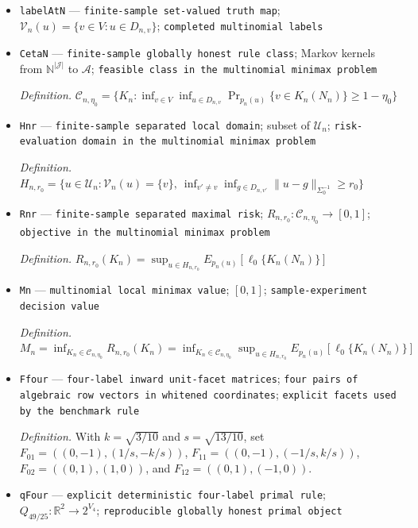 \documentclass{article}
\begin{document}
\begin{itemize}
  \item \texttt{labelAtN} --- \texttt{finite-\allowbreak{}sample set-\allowbreak{}valued truth map}; \(\mathcal V_n(u)=\{v\in V:u\in D_{n,v}\}\); \texttt{completed multinomial labels}
  \item \texttt{CetaN} --- \texttt{finite-\allowbreak{}sample globally honest rule class}; Markov kernels from \(\mathbb N^{|\mathcal J|}\) to \(\mathcal A\); \texttt{feasible class in the multinomial minimax problem}
  \par\smallskip\noindent\emph{Definition.} \(\mathcal C_{n,\eta_0}=\{K_n:\inf_{v\in V}\inf_{u\in D_{n,v}}\Pr_{p_n(u)}\{v\in K_n(N_n)\}\ge1-\eta_0\}\)
  \item \texttt{Hnr} --- \texttt{finite-\allowbreak{}sample separated local domain}; subset of \(\mathcal U_n\); \texttt{risk-\allowbreak{}evaluation domain in the multinomial minimax problem}
  \par\smallskip\noindent\emph{Definition.} \(H_{n,r_0}=\{u\in\mathcal U_n:\mathcal V_n(u)=\{v\},\ \inf_{v'\ne v}\inf_{g\in D_{n,v'}}\|u-g\|_{\Sigma_0^{-1}}\ge r_0\}\)
  \item \texttt{Rnr} --- \texttt{finite-\allowbreak{}sample separated maximal risk}; \(R_{n,r_0}:\mathcal C_{n,\eta_0}\to[0,1]\); \texttt{objective in the multinomial minimax problem}
  \par\smallskip\noindent\emph{Definition.} \(R_{n,r_0}(K_n)=\sup_{u\in H_{n,r_0}}E_{p_n(u)}[\ell_0\{K_n(N_n)\}]\)
  \item \texttt{Mn} --- \texttt{multinomial local minimax value}; \([0,1]\); \texttt{sample-\allowbreak{}experiment decision value}
  \par\smallskip\noindent\emph{Definition.} \(M_n=\inf_{K_n\in\mathcal C_{n,\eta_0}}R_{n,r_0}(K_n)=\inf_{K_n\in\mathcal C_{n,\eta_0}}\sup_{u\in H_{n,r_0}}E_{p_n(u)}[\ell_0\{K_n(N_n)\}]\)
  \item \texttt{Ffour} --- \texttt{four-\allowbreak{}label inward unit-\allowbreak{}facet matrices}; \texttt{four pairs of algebraic row vectors in whitened coordinates}; \texttt{explicit facets used by the benchmark rule}
  \par\smallskip\noindent\emph{Definition.} With \(k=\sqrt{3/10}\) and \(s=\sqrt{13/10}\), set \(F_{01}=((0,-1),(1/s,-k/s))\), \(F_{11}=((0,-1),(-1/s,k/s))\), \(F_{02}=((0,1),(1,0))\), and \(F_{12}=((0,1),(-1,0))\).
  \item \texttt{qFour} --- \texttt{explicit deterministic four-\allowbreak{}label primal rule}; \(Q_{49/25}:\mathbb R^2\to2^{V_4}\); \texttt{reproducible globally honest primal object}

\end{itemize}
\end{document}
